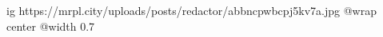  
 
 
 
 

\ifcmt
  ig https://mrpl.city/uploads/posts/redactor/abbncpwbcpj5kv7a.jpg
  @wrap center
  @width 0.7
\fi
